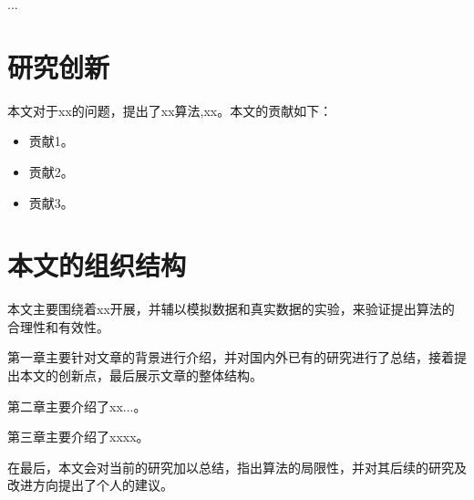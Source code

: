 ...




\section{研究创新}

本文对于xx的问题，提出了xx算法,xx。本文的贡献如下：
\begin{itemize}
    \item 贡献1。
    \item 贡献2。
    \item 贡献3。
\end{itemize}

\section{本文的组织结构}
本文主要围绕着xx开展，并辅以模拟数据和真实数据的实验，来验证提出算法的合理性和有效性。

第一章主要针对文章的背景进行介绍，并对国内外已有的研究进行了总结，接着提出本文的创新点，最后展示文章的整体结构。

第二章主要介绍了xx...。

第三章主要介绍了xxxx。

在最后，本文会对当前的研究加以总结，指出算法的局限性，并对其后续的研究及改进方向提出了个人的建议。
